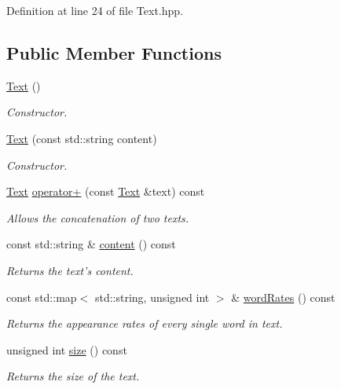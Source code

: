 Definition at line 24 of file Text.hpp.\subsection*{Public Member Functions}
\begin{CompactItemize}
\item 
\hyperlink{class_text_b3e26143fccc52699bcc5149cae852bc}{Text} ()
\begin{CompactList}\small\item\em Constructor. \item\end{CompactList}\item 
\hyperlink{class_text_c3c20ee8baeb7b88e2622724f57e50a2}{Text} (const std::string content)
\begin{CompactList}\small\item\em Constructor. \item\end{CompactList}\item 
\hyperlink{class_text}{Text} \hyperlink{class_text_c8887fb224e0402448ede4f3b9f7452d}{operator+} (const \hyperlink{class_text}{Text} \&text) const 
\begin{CompactList}\small\item\em Allows the concatenation of two texts. \item\end{CompactList}\item 
const std::string \& \hyperlink{class_text_8b6ac381338c5b3f719600b5f9be222c}{content} () const 
\begin{CompactList}\small\item\em Returns the text's content. \item\end{CompactList}\item 
const std::map$<$ std::string, unsigned int $>$ \& \hyperlink{class_text_f1588ae161a4c4894b2ce1a1d29ebc22}{wordRates} () const 
\begin{CompactList}\small\item\em Returns the appearance rates of every single word in text. \item\end{CompactList}\item 
unsigned int \hyperlink{class_text_b66729ba84c2698ed888f641b3838a8b}{size} () const 
\begin{CompactList}\small\item\em Returns the size of the text. \item\end{CompactList}\item 

\end{CompactItemize}
